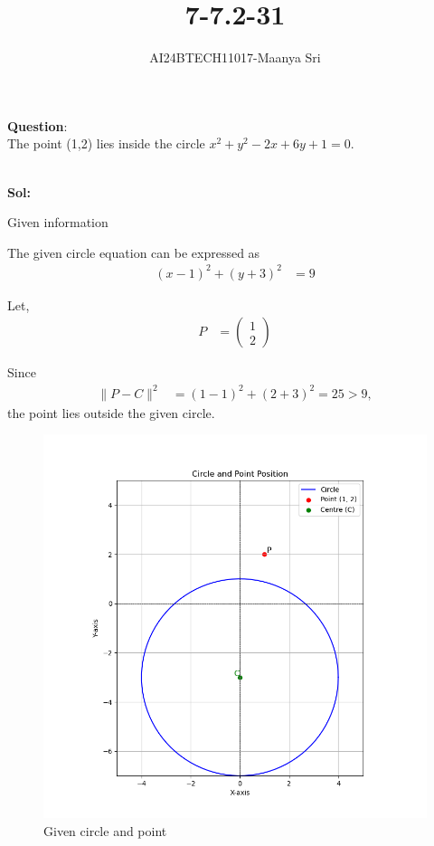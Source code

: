\documentclass[journal]{IEEEtran}
\begin{document}

\vspace{3cm}

\title{7-7.2-31}
\author{AI24BTECH11017-Maanya Sri}
{\let\newpage\relax\maketitle}

\renewcommand{\thefigure}{\theenumi}
\renewcommand{\thetable}{\theenumi}
\setlength{\intextsep}{10pt} %


\textbf{Question}:\\
The point (1,2) lies inside the circle \(x^2 + y^2 - 2x + 6y + 1 = 0\).

\\ \textbf{Sol:}
\begin{table}[h!]
	\centering
	\caption{Given information}
	\label{tab7.2.31.1}
\end{table}

The given circle equation can be expressed as
\begin{align}
(x - 1)^2 + (y + 3)^2 &= 9 
\end{align}

Let,
\begin{align}
P &= 
\begin{pmatrix}
1 \\
2
\end{pmatrix}
\end{align}

Since
\begin{align}
\|P - C\|^2 &= (1 - 1)^2 + (2 + 3)^2 = 25 > 9, 
\end{align}
the point lies outside the given circle.

\begin{figure}[h!]
	\centering
	\includegraphics[width=0.7\linewidth]{figure/Figure_1.png} %
	\caption{Given circle and point}
\end{figure}
\end{document}
